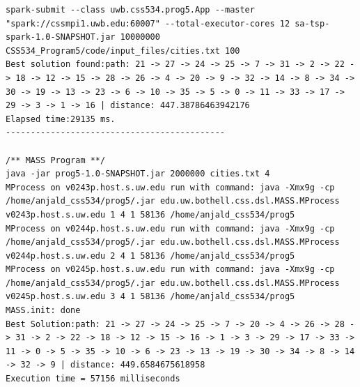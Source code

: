 \documentclass{article}
\begin{document}
\begin{lstlisting}
spark-submit --class uwb.css534.prog5.App --master "spark://cssmpi1.uwb.edu:60007" --total-executor-cores 12 sa-tsp-spark-1.0-SNAPSHOT.jar 10000000 CSS534_Program5/code/input_files/cities.txt 100
Best solution found:path: 21 -> 27 -> 24 -> 25 -> 7 -> 31 -> 2 -> 22 -> 18 -> 12 -> 15 -> 28 -> 26 -> 4 -> 20 -> 9 -> 32 -> 14 -> 8 -> 34 -> 30 -> 19 -> 13 -> 23 -> 6 -> 10 -> 35 -> 5 -> 0 -> 11 -> 33 -> 17 -> 29 -> 3 -> 1 -> 16 | distance: 447.38786463942176
Elapsed time:29135 ms.
--------------------------------------------

/** MASS Program **/
java -jar prog5-1.0-SNAPSHOT.jar 2000000 cities.txt 4
MProcess on v0243p.host.s.uw.edu run with command: java -Xmx9g -cp /home/anjald_css534/prog5/.jar edu.uw.bothell.css.dsl.MASS.MProcess v0243p.host.s.uw.edu 1 4 1 58136 /home/anjald_css534/prog5
MProcess on v0244p.host.s.uw.edu run with command: java -Xmx9g -cp /home/anjald_css534/prog5/.jar edu.uw.bothell.css.dsl.MASS.MProcess v0244p.host.s.uw.edu 2 4 1 58136 /home/anjald_css534/prog5
MProcess on v0245p.host.s.uw.edu run with command: java -Xmx9g -cp /home/anjald_css534/prog5/.jar edu.uw.bothell.css.dsl.MASS.MProcess v0245p.host.s.uw.edu 3 4 1 58136 /home/anjald_css534/prog5
MASS.init: done
Best Solution:path: 21 -> 27 -> 24 -> 25 -> 7 -> 20 -> 4 -> 26 -> 28 -> 31 -> 2 -> 22 -> 18 -> 12 -> 15 -> 16 -> 1 -> 3 -> 29 -> 17 -> 33 -> 11 -> 0 -> 5 -> 35 -> 10 -> 6 -> 23 -> 13 -> 19 -> 30 -> 34 -> 8 -> 14 -> 32 -> 9 | distance: 449.6584675618958
Execution time = 57156 milliseconds


			\end{lstlisting}	
	
\end{document}
